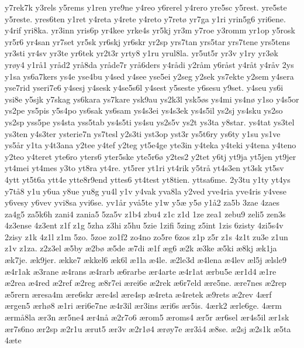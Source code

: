 {y7rek7k
y3rels
y5rems
y1ren
yre9ne
y4reo
y6rerel
y4rero
yre5sc
y5rest.
yre5ste
y5reste.
yres6ten
y1ret
y4reta
y4rete
y4reto
y7ret^^f8
yr7ga
y1ri
yrin5g6
yri6ene.
y4rif
yri8ka.
yr3inn
yris6p
yr4kee
yrke4s
yr5kj
yr3m
y7roe
y3romm
yr1op
y5rosk
yr5r6
yr4san
yr7set
yr5sk
yr6skj
yr6skr
yr2sp
yrs7tan
yrs5tar
yrs7tene
yrs5tens
yr3sti
yr4sv
yr3te
yr6tek
yr2t3r
yrty8
y1ru
yrul8la.
yr5ut5r
yr3v
y1ry
yr3^^f8k
yr^^f8y4
y1r^^e51
yr^^e5d2
yr^^e58da
yr^^e5de7r
yr^^e56ders
y4r^^e5di
y2r^^e5m
y6r^^e5st
y4r^^e5t
y4r^^e5v
2ys
y1sa
ys6a7kers
ys4e
yse4bu
y4sed
y4see
yse5ei
y2seg
y2sek
ys7ekte
y2sem
y4sera
yse7rid
yseri7e6
y4sesj
y4sesk
y4se5s6l
y4sest
y5seste
y6sesu
y9set.
y4seu
ys6i
ysi8e
y5sjk
y7skag
ys6kara
ys7kare
ysk9au
ys2k3l
ysk5^^f8s
ys4mi
ys4n^^f8
y1so
y4s5or
ys2pe
ys5pis
y5s4po
ys6sak
ys6sam
ys4s3ei
ys4s3ek
ys4s5il
ys2sj
ys4sku
ys2so
ys2sp
yss5pe
ys4sta
yss5tab
ys4s5ti
ys4su
ys2s5v
ys2t
ys3ta
y8star.
ys4tat
ys3tel
ys3ten
y4s3ter
ysterie7n
ys7tesl
y2s3ti
yst3op
yst3r
ys5t6ry
ys6ty
y1su
ys1ve
ys5^^e5r
y1ta
y4t3ana
y2tee
y4tef
y2teg
yt5e4ge
yte3in
y4teka
y4teki
y4tena
y4teno
y2teo
y4teret
yte6ro
yters6
yter5ske
yte5r6^^f8
y2tes2
y2tet
y6tj
yt9ja
yt5jen
yt9jer
yt4mei
yt4mes
y3to
yt8ra
yt4re.
yt5rer
yt1ri
yt4rik
y5tr^^e5
yt4s3en
yt3sk
yt5sv
4ytt
yt5t6a
ytt4e
ytte8r9end
yttes6
yt4test
yt8tien.
yttsa6me.
2y3tu
y1ty
yt4ys
y7t^^e58
y1u
y6ua
y8ue
yu8g
yu4l
y1v
y4vak
yva8la
y2ved
yve4ria
yve4ris
y4vese
y6vesy
y6vev
yvi8sa
yvi6se.
yv1^^e5r
yv^^e55te
y1w
y5^^e6
y5^^f8
y1^^e52
za5b
3zae
4zaes
za4g5
za5k6h
zani4
zania5
5za5v
z1b4
zbu4
z1c
z1d
1ze
zea1
zebu9
zeli5
zen3s
4z3ense
4z3ent
z1f
z1g
5zha
z3hi
z5hu
5zie
1zifi
5zing
z5int
1zis
6zisty
4zi5s4v
2zisy
z1k
4z1l
z1m
5zo.
5zoe
zo1f2
zo4no
zo5re
6zos
z1p
z5r
z1s
4z1t
zu3e
z1un
z1v
z1za.
z2z3el
^^e65by
^^e62b^^f8
^^e65de
^^e67di
^^e61f
^^e6g6
^^e62k
^^e63ke
^^e65ki
^^e68kj
^^e6k1ja
^^e6k7je.
^^e6k9jer.
^^e6kke7
^^e6kkel6
^^e6k6l
^^e61la
^^e64le.
^^e62le3d
^^e64lena
^^e64lev
^^e6l5j
^^e6lsle9
^^e64r1ak
^^e63rane
^^e64rans
^^e64rarb
^^e66rarbe
^^e6r4arte
^^e64r1at
^^e6rbu5e
^^e6r1d4
^^e61re
^^e62rea
^^e64red
^^e62ref
^^e62reg
^^e68r7ei
^^e6rei6e
^^e62rek
^^e66r7eld
^^e6re5ne.
^^e6re7nes
^^e62rep
^^e65rern
^^e6resa4m
^^e6re6skr
^^e6re4sl
^^e6re4sp
^^e64reta
^^e64retek
^^e69rets
^^e62rev
4^^e6rf
^^e6rgen5
^^e6rh^^f88
^^e61ri
^^e6ri6e7ne
^^e64r3il
^^e6r3ins
^^e6ri6s
^^e6r5is.
4^^e6rk2
^^e6rle6ge.
4^^e6rm
^^e6rm^^e58la
^^e6r3n
^^e6r5ne4
^^e6r4n^^e5
^^e62r7o6
^^e6rom5
^^e6roms4
^^e6r5r
^^e6r6sel
^^e6r4s5il
^^e6r1sk
^^e6r7s6no
^^e6r2sp
^^e62r1u
^^e6rut5
^^e6r3v
^^e62r1^^f84
^^e6r^^f8y7e
^^e6r3^^e54
^^e68se.
^^e62sj
^^e62s1k
^^e65ta
4^^e6te
}

